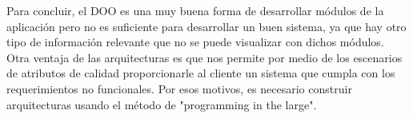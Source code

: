 \documentclass{article}
\theoremstyle{definition}
\theoremstyle{remark}
\begin{document}
Para concluir, el DOO es una muy buena forma de desarrollar módulos de la aplicación pero no es suficiente para desarrollar un buen sistema, ya que hay otro tipo de información relevante que no se puede visualizar con dichos módulos. Otra ventaja de las arquitecturas es que nos permite por medio de los escenarios de atributos de calidad proporcionarle al cliente un sistema que cumpla con los requerimientos no funcionales. Por esos motivos, es necesario construir arquitecturas usando el método de "programming in the large".
\end{document}
